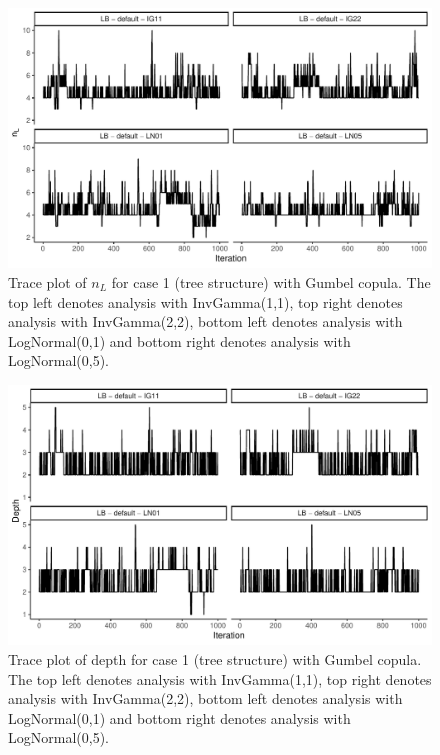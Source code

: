 \documentclass{amsart}
\begin{document}

\begin{figure}
	\centering
	\includegraphics[width = 0.75\linewidth]{trace_case1_gumbel_nterm.pdf}
	\caption{Trace plot of $n_L$ for case 1 (tree structure) with Gumbel copula. The top left denotes analysis with InvGamma(1,1), top right denotes analysis with InvGamma(2,2), bottom left denotes analysis with LogNormal(0,1) and bottom right denotes analysis with LogNormal(0,5).}
	\label{fig:case1:gumbel:nterm}
\end{figure}

\begin{figure}
	\centering
	\includegraphics[width = 0.75\linewidth]{trace_case1_gumbel_depth.pdf}
	\caption{Trace plot of depth for case 1 (tree structure) with Gumbel copula. The top left denotes analysis with InvGamma(1,1), top right denotes analysis with InvGamma(2,2), bottom left denotes analysis with LogNormal(0,1) and bottom right denotes analysis with LogNormal(0,5).}
	\label{fig:case1:gumbel:depth}
\end{figure}
\end{document}
